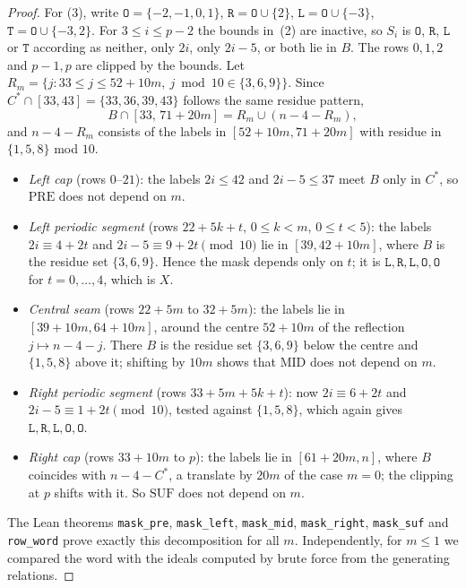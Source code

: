 \documentclass[11pt]{amsart}
\theoremstyle{definition}
\theoremstyle{remark}
\newcommand{\mk}[1]{\mathtt{#1}}
\begin{document}
\begin{proof}
For (3), write $\mk{O}=\{-2,-1,0,1\}$, $\mk{R}=\mk{O}\cup\{2\}$, $\mk{L}=\mk{O}\cup\{-3\}$, $\mk{T}=\mk{O}\cup\{-3,2\}$. For $3\le i\le p-2$ the bounds in~(2) are inactive, so $S_i$ is $\mk{O}$, $\mk{R}$, $\mk{L}$ or $\mk{T}$ according as neither, only $2i$, only $2i-5$, or both lie in $B$. The rows $0,1,2$ and $p-1,p$ are clipped by the bounds. Let $R_m=\{j: 33\le j\le 52+10m,\ j\bmod10\in\{3,6,9\}\}$. Since $C^*\cap[33,43]=\{33,36,39,43\}$ follows the same residue pattern,
\[
B\cap[33,\,71+20m]=R_m\cup(n-4-R_m),
\]
and $n-4-R_m$ consists of the labels in $[52+10m,71+20m]$ with residue in $\{1,5,8\}$ mod $10$.
\begin{itemize}
\item \emph{Left cap} (rows $0$--$21$): the labels $2i\le42$ and $2i-5\le37$ meet $B$ only in $C^*$, so $\mathrm{PRE}$ does not depend on $m$.
\item \emph{Left periodic segment} (rows $22+5k+t$, $0\le k<m$, $0\le t<5$): the labels $2i\equiv4+2t$ and $2i-5\equiv9+2t \pmod{10}$ lie in $[39,42+10m]$, where $B$ is the residue set $\{3,6,9\}$. Hence the mask depends only on $t$; it is $\mk{L},\mk{R},\mk{L},\mk{O},\mk{O}$ for $t=0,\dots,4$, which is $X$.
\item \emph{Central seam} (rows $22+5m$ to $32+5m$): the labels lie in $[39+10m,64+10m]$, around the centre $52+10m$ of the reflection $j\mapsto n-4-j$. There $B$ is the residue set $\{3,6,9\}$ below the centre and $\{1,5,8\}$ above it; shifting by $10m$ shows that $\mathrm{MID}$ does not depend on $m$.
\item \emph{Right periodic segment} (rows $33+5m+5k+t$): now $2i\equiv6+2t$ and $2i-5\equiv1+2t\pmod{10}$, tested against $\{1,5,8\}$, which again gives $\mk{L},\mk{R},\mk{L},\mk{O},\mk{O}$.
\item \emph{Right cap} (rows $33+10m$ to $p$): the labels lie in $[61+20m,n]$, where $B$ coincides with $n-4-C^*$, a translate by $20m$ of the case $m=0$; the clipping at $p$ shifts with it. So $\mathrm{SUF}$ does not depend on $m$.
\end{itemize}
The Lean theorems \texttt{mask\_pre}, \texttt{mask\_left}, \texttt{mask\_mid}, \texttt{mask\_right}, \texttt{mask\_suf} and \texttt{row\_word} prove exactly this decomposition for all $m$. Independently, for $m\le1$ we compared the word with the ideals computed by brute force from the generating relations.
\end{proof}
\end{document}
